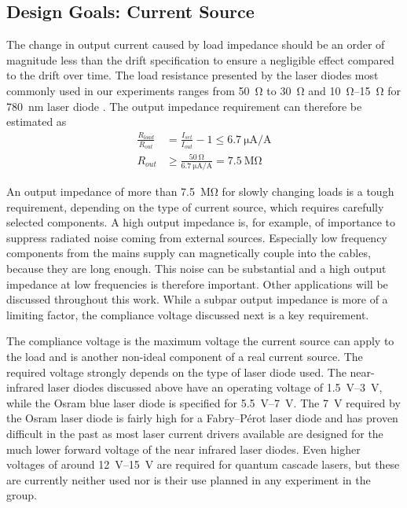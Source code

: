 \subsection{Design Goals: Current Source}
The change in output current caused by load impedance should be an order of magnitude less than the drift specification to ensure a negligible effect compared to the drift over time. The load resistance presented by the laser diodes most commonly used in our experiments ranges from \qty{50}{\ohm} \cite{datasheet_osram_pl450b} to \qty{30}{\ohm} \cite{datasheet_adl_785} and \qtyrange{10}{15}{\ohm} for \qty{780}{\nm} laser diode \cite{datasheet_sharp_780nm,datasheet_thorlabs_780nm}. The output impedance requirement can therefore be estimated as
\begin{align}
    \frac{R_{load}}{R_{out}} &= \frac{I_{set}}{I_{out}} - 1 \leq \qty[per-mode = symbol]{6.7}{\uA \per \A} \nonumber\\
    R_{out} &\geq \frac{\qty{50}{\ohm}}{\qty[per-mode = symbol]{6.7}{\uA \per \A}} = \qty{7.5}{\mega \ohm}
\end{align}

An output impedance of more than \qty{7.5}{\mega \ohm} for slowly changing loads is a tough requirement, depending on the type of current source, which requires carefully selected components. A high output impedance is, for example, of importance to suppress radiated noise coming from external sources. Especially low frequency components from the mains supply can magnetically couple into the cables, because they are long enough. This noise can be substantial and a high output impedance at low frequencies is therefore important. Other applications will be discussed throughout this work. While a subpar output impedance is more of a limiting factor, the compliance voltage discussed next is a key requirement.

The compliance voltage is the maximum voltage the current source can apply to the load and is another non-ideal component of a real current source. The required voltage strongly depends on the type of laser diode used. The near-infrared laser diodes discussed above have an operating voltage of \qtyrange{1.5}{3}{\V}, while the Osram  blue laser diode is specified for \qtyrange{5.5}{7}{\V}. The \qty{7}{\V} required by the Osram laser diode is fairly high for a Fabry–Pérot laser diode and has proven difficult in the past \cite{thesis_baus} as most laser current drivers available are designed for the much lower forward voltage of the near infrared laser diodes. Even higher voltages of around \qtyrange{12}{15}{\V} are required for quantum cascade lasers, but these are currently neither used nor is their use planned in any experiment in the group.

